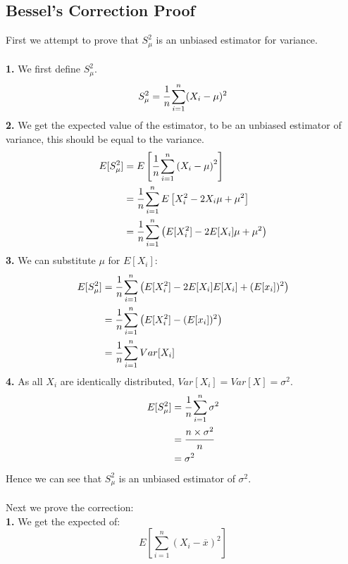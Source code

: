 \documentclass{report}
\begin{document}
        \subsection*{Bessel's Correction Proof}
            First we attempt to prove that $S_\mu^2$ is an unbiased estimator for variance.
            \\
            \\ \textbf{1.} We first define $S_\mu^2$.
            \[S_\mu^2 = \cfrac{1}{n}\sum_{i=1}^n(X_i - \mu)^2\]
            \textbf{2. } We get the expected value of the estimator, to be an unbiased estimator of variance, this should be equal to the variance.
            \[\begin{split}
                E[S_\mu^2] &= E\left[ \cfrac{1}{n} \sum_{i = 1}^n \left( X_i - \mu \right)^2 \right] \\
                &= \cfrac{1}{n}\sum_{i = 1}^n E\left[X_i^2 - 2X_i\mu + \mu^2 \right] \\
                &= \cfrac{1}{n}\sum_{i = 1}^n \left( E[X_i^2] - 2E[X_i]\mu + \mu^2 \right) \\
            \end{split}\]
            \textbf{3. } We can substitute $\mu$ for $E[X_i]$:
            \[\begin{split}
                E[S_\mu^2] &= \cfrac{1}{n}\sum_{i = 1}^n \left( E[X_i^2] - 2E[X_i]E[X_i] + (E[x_i])^2 \right) \\
                &= \cfrac{1}{n}\sum_{i = 1}^n \left( E[X_i^2] - (E[x_i])^2 \right) \\
                &= \cfrac{1}{n}\sum_{i = 1}^n Var[X_i] \\
            \end{split} \]
            \textbf{4. } As all $X_i$ are identically distributed, $Var[X_i] = Var[X] = \sigma^2$.
            \[\begin{split}
                E[S_\mu^2] &= \cfrac{1}{n}\sum_{i = 1}^n \sigma^2 \\
                &= \cfrac{n \times \sigma^2}{n} \\
                &= \sigma^2 \\
            \end{split}\]
            Hence we can see that $S^2_\mu$ is an unbiased estimator of $\sigma^2$.
            \\
            \\ Next we prove the correction:
            \\ \textbf{1. } We get the expected of:
            \[E\left[ \sum_{i = 1}^n ( X_i - \overline{x} )^2 \right]\]
\end{document}
